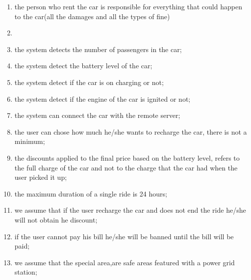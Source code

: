 \begin{enumerate}
	\item the person who rent the car is responsible for everything that could happen to the car(all the damages and all the types of fine)
	\item 
	\item the system detects the number of passengers in the car;
	\item the system detect the battery level of the car;
	\item the system detect if the car is on charging or not;
	\item the system detect if the engine of the car is ignited or not;
	\item the system can connect the car with the remote server;
	\item the user can chose how much he/she wants to recharge the car, there is not a minimum;
	\item the discounts applied to the final price based on the battery level, refers to the full charge of the car and not to the charge that the car had when the user picked it up;
	\item the maximum duration of a single ride is 24 hours;
	\item we assume that if the user recharge the car and does not end the ride he/she will not obtain he discount;
	\item if the user cannot pay his bill he/she will be banned until the bill will be paid;
	\item we assume that the special area,are safe areas featured with a power grid station;
\end{enumerate}
